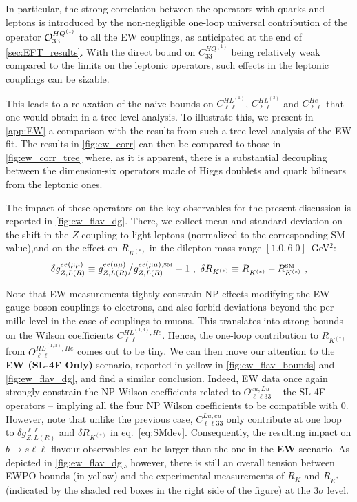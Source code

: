 \noindent In particular, the strong correlation between the operators with quarks and leptons is introduced by the non-negligible one-loop universal contribution of the operator ${\cal O}_{33}^{HQ^{(1)}}$ to all the EW couplings, as anticipated at the end of \autoref{sec:EFT_results}. 
With the direct bound on $C_{33}^{HQ^{(1)}}$ being relatively weak compared to the limits on the leptonic operators, such effects in the leptonic couplings can be sizable. 

This leads to a relaxation of the naive bounds on $C^{HL^{(1)}}_{\ell\ell}$, $C^{HL^{(3)}}_{\ell\ell}$ and $C^{He}_{\ell\ell}$ that one would obtain in a tree-level analysis.
To illustrate this, we present in \autoref{app:EW} a comparison with the results from such a tree level analysis of the EW fit. The results in \autoref{fig:ew_corr} can then be compared to those in \autoref{fig:ew_corr_tree} where, as it is apparent, there is a substantial decoupling between the dimension-six operators made of Higgs doublets and quark bilinears from the leptonic ones.


The impact of these operators on the key observables for the present discussion is reported in \autoref{fig:ew_flav_dg}. There, we collect mean and standard deviation on the shift in the $Z$ coupling to light leptons (normalized to the corresponding SM value),and on the effect on $R_{K^{(*)}}$ in the dilepton-mass range $[1.0,6.0]$~GeV$^2$: 
\begin{equation}
	\label{eq:SMdev}
	\delta g_{Z,L(R)}^{ee(\mu\mu)} \equiv g_{Z,L(R)}^{ee(\mu\mu)}{\big/}g_{Z,L(R)}^{ee(\mu\mu),\textrm{\tiny SM}}-1  \ , \ \delta R_{K^{(*)}} \equiv R_{K^{(*)}}^{ } - R_{K^{(*)}}^{\textrm{\tiny SM}} \ ,
\end{equation}

Note that EW measurements tightly constrain NP effects modifying the %
EW gauge boson couplings to electrons, and also forbid deviations beyond the per-mille level in the case of  couplings to muons. This translates into strong bounds on the Wilson coefficients $C^{H L^{(1,3)},H e}_{\ell \ell}$. Hence, the one-loop contribution to $R_{K^{(*)}}$ from $O^{H L^{(1,3)},H e}_{\ell \ell}$ comes out to be tiny. We can then move our attention to the {\bf EW (SL-4F Only)} scenario, reported in yellow in \autoref{fig:ew_flav_bounds} and \autoref{fig:ew_flav_dg}, and find a similar conclusion. Indeed, EW data once again strongly constrain the NP Wilson coefficients related to $O^{eu,L u}_{\ell \ell 33}$ -- the SL-4F operators -- implying all the four NP Wilson coefficients to be compatible with 0. However, note that unlike the previous case, $C^{Lu,eu}_{\ell \ell 3 3}$ only contribute at one loop to $\delta g_{Z,L(R)}^{\ell\ell}$ and $\delta R_{K^{(*)}}$ in eq.~\eqref{eq:SMdev}. Consequently, the resulting impact on $b \to s  \ell \ell$ flavour observables can be larger than the one in the {\bf EW} scenario. As depicted in \autoref{fig:ew_flav_dg}, however, there is still an overall tension between EWPO bounds (in yellow) and the experimental measurements of $R_K$ and $R_{K^*}$ (indicated by the shaded red boxes in the right side of the figure) at the 3$\sigma$ level.

